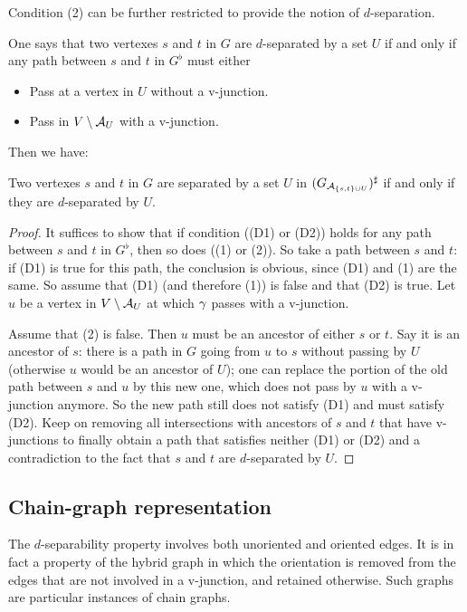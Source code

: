 Condition (2) can be further restricted to provide the notion of
$d$-separation.
\begin{definition}
\label{def:d.sep}
One says that two vertexes $s$ and $t$ in $G$ are
$d$-separated by a set $U$ if and
only if any path between $s$ and $t$ in $G^\flat$ must either
\begin{itemize}
\item[(D1)] Pass at a vertex in $U$ without a v-junction.
\item[(D2)] Pass in  $V \setminus {\mathcal A}_{U}$ with a v-junction.
\end{itemize}
\end{definition}

Then we have:
\begin{theorem}
\label{th:d.sep}
Two vertexes $s$ and $t$ in $G$ are
separated by a set $U$ in $(G_{{\mathcal A}_{\{s,t\}\cup U}})^\sharp$ if and
only if they are $d$-separated by $U$.
\end{theorem}
\begin{proof}
It suffices to show that if condition ((D1) or (D2)) holds for any path between
$s$ and $t$ in $G^\flat$, then so does  ((1) or (2)).  So take a path between
$s$ and $t$: if (D1) is true for this path, the
conclusion is obvious, since (D1) and (1) are the same. So assume that
(D1) (and therefore (1)) is false and that (D2) is true. Let $u$ be a
vertex in $V\setminus \mathcal A_U$ at which $\gamma$ passes with a v-junction.

Assume that (2) is false. Then $u$ must be an
ancestor of either $s$ or $t$. Say it is an ancestor of $s$: there is
a path in $G$ going from $u$ to $s$  without passing by $U$ (otherwise
$u$ would be an ancestor of $U$); one can replace the portion
of the old path between $s$ and $u$ by this new one, which does not
pass by $u$ with a v-junction anymore. So the new path still does
not satisfy (D1) and must satisfy (D2). Keep on removing all
intersections with ancestors of $s$ and $t$ that have v-junctions to
finally obtain a path that satisfies neither (D1) or (D2) and a
contradiction to the
fact that $s$ and $t$ are $d$-separated by $U$.
\end{proof}

\subsection{Chain-graph representation}
The $d$-separability property involves both unoriented and oriented
edges. It is in fact a property of the hybrid graph in which the
orientation is removed from the edges that are not involved in a
v-junction, and retained otherwise. Such graphs are particular
instances of chain graphs.

